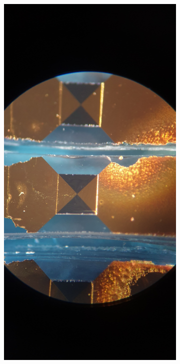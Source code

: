 \begin{figure}[h!]
\centering
\begin{subfigure}{1\textwidth}
    \centering
    \includegraphics[scale=0.07]{Figures/Misc/SysDev/20220428_104202.jpg}

\end{subfigure}
\end{figure}
